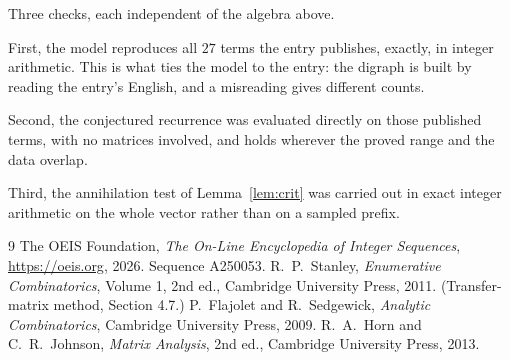 \documentclass[11pt,a4paper]{article}
\theoremstyle{plain}
\theoremstyle{definition}
\begin{document}
Three checks, each independent of the algebra above.

First, the model reproduces all $27$ terms the entry publishes, exactly, in integer
arithmetic. This is what ties the model to the entry: the digraph is built by reading the
entry's English, and a misreading gives different counts.

Second, the conjectured recurrence was evaluated directly on those published terms, with no
matrices involved, and holds wherever the proved range and the data overlap.

Third, the annihilation test of Lemma~\ref{lem:crit} was carried out in exact integer
arithmetic on the whole vector rather than on a sampled prefix.

\begin{thebibliography}{9}
 The OEIS Foundation, \emph{The On-Line Encyclopedia of Integer
Sequences}, \url{https://oeis.org}, 2026. Sequence A250053.
 R.~P.~Stanley, \emph{Enumerative Combinatorics}, Volume 1, 2nd ed.,
Cambridge University Press, 2011. (Transfer-matrix method, Section 4.7.)
 P.~Flajolet and R.~Sedgewick, \emph{Analytic Combinatorics}, Cambridge
University Press, 2009.
 R.~A.~Horn and C.~R.~Johnson, \emph{Matrix Analysis}, 2nd ed., Cambridge
University Press, 2013.
\end{thebibliography}
\end{document}
